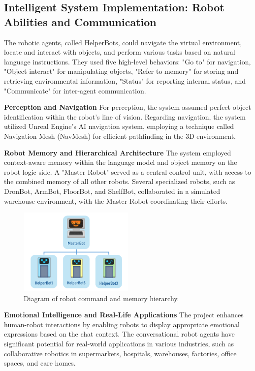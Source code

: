 \documentclass[pdflatex,sn-mathphys-num]{sn-jnl}%
\theoremstyle{thmstyleone}%
\theoremstyle{thmstyletwo}%
\theoremstyle{thmstylethree}%
\begin{document}
\subsection{Intelligent System Implementation: Robot Abilities and Communication}

The robotic agents, called HelperBots, could navigate the virtual environment, locate and interact with objects, and perform various tasks based on natural language instructions. They used five high-level behaviors: "Go to" for navigation, "Object interact" for manipulating objects, "Refer to memory" for storing and retrieving environmental information, "Status" for reporting internal status, and "Communicate" for inter-agent communication.


\textbf{Perception and Navigation}
For perception, the system assumed perfect object identification within the robot's line of vision. Regarding navigation, the system utilized Unreal Engine's AI navigation system, employing a technique called Navigation Mesh (NavMesh) for efficient pathfinding in the 3D environment.

\textbf{Robot Memory and Hierarchical Architecture}
The system employed context-aware memory within the language model and object memory on the robot logic side. A "Master Robot" served as a central control unit, with access to the combined memory of all other robots. Several specialized robots, such as DronBot, ArmBot, FloorBot, and ShelfBot, collaborated in a simulated warehouse environment, with the Master Robot coordinating their efforts.
\begin{figure}[h]
\centering
\includegraphics[width=0.5\textwidth]{figures/Picture6.png}
\caption{Diagram of robot command and memory hierarchy.}\label{fig9}
\end{figure}

\textbf{Emotional Intelligence and Real-Life Applications
}The project enhances human-robot interactions by enabling robots to display appropriate emotional expressions based on the chat context. The conversational robot agents have significant potential for real-world applications in various industries, such as collaborative robotics in supermarkets, hospitals, warehouses, factories, office spaces, and care homes.
\end{document}
